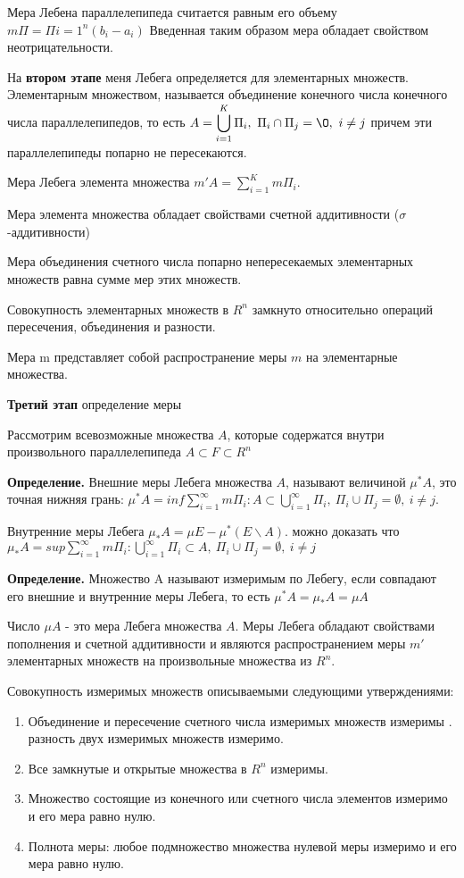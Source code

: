 \documentclass[12pt]{report}
\newcommand{\be}{\begin{enumerate}}
\newcommand{\ee}{\end{enumerate}}
\renewcommand{\[}{$\\\displaystyle}
\renewcommand{\]}{\\$}
\renewcommand{\[}{$\\\displaystyle}
\newcommand{\sep}{,\ }
\newcommand{\tdef}{\textbf{Определение.} }
\begin{document}
Мера Лебена параллелепипеда считается равным его объему $m\Pi = \Pi{i=1}^n(b_i-a_i)$ Введенная таким образом мера обладает свойством неотрицательности.

На \textbf{втором этапе} меня Лебега определяется для элементарных множеств. Элементарным множеством, называется объединение конечного числа конечного числа параллелепипедов, то есть
\[
  A=\bigcup _{i=1}^K {\Pi}_i\sep{\Pi}_i \cap {\Pi}_j = \O\sep i\neq j
\]
причем эти параллелепипеды попарно не пересекаются.

Мера Лебега элемента множества $m'A=\sum_{i=1}^Km\Pi_i$.

Мера элемента множества обладает свойствами счетной аддитивности ($\sigma$-аддитивности)

Мера объединения счетного числа попарно непересекаемых элементарных множеств равна сумме мер этих множеств.

Совокупность элементарных множеств в $R^n$ замкнуто относительно операций пересечения, объединения и разности.

Мера m представляет собой распространение меры $m$ на элементарные множества.

\textbf{Третий этап} определение меры

Рассмотрим всевозможные множества $A$, которые содержатся внутри произвольного параллелепипеда $A\subset F \subset R^n$

\tdef Внешние меры Лебега множества $A$, называют величиной $\mu^*A$, это точная нижняя грань: $\mu^*A=inf\sum_{i=1}^\infty m\Pi_i: A\subset\bigcup _{i=1}^\infty\Pi_i\sep \Pi_i\cup\Pi_j=\emptyset\sep i\neq j$.

Внутренние меры Лебега $\mu_*A=\mu E-\mu^*(E\backslash A)$. можно доказать что $\mu_*A=sup\sum_{i=1}^\infty m\Pi_i: \bigcup _{i=1}^\infty\Pi_i \subset A\sep \Pi_i\cup\Pi_j=\emptyset\sep i\neq j$

\tdef Множество A называют измеримым по Лебегу, если совпадают его внешние и внутренние меры Лебега, то есть $\mu^*A=\mu_*A=\mu A$

Число $\mu A$ - это мера Лебега множества $A$. Меры Лебега обладают свойствами пополнения и счетной аддитивности и являются распространением меры $m'$ элементарных множеств на произвольные множества из $R^n$.

Совокупность измеримых множеств описываемыми следующими утверждениями:
\be
  \item Объединение и пересечение счетного числа измеримых множеств измеримы . разность двух измеримых множеств измеримо.
  \item Все замкнутые и открытые множества в $R^n$ измеримы.
  \item Множество состоящие из конечного или счетного числа элементов измеримо и его мера равно нулю.
  \item Полнота меры: любое подмножество множества нулевой меры измеримо и его мера равно нулю.
\ee
\end{document}
